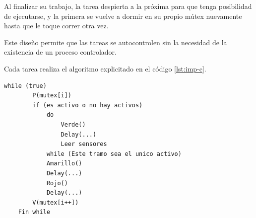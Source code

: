 Al finalizar su trabajo, la tarea despierta a la próxima para que tenga posibilidad de ejecutarse, y la primera se vuelve a dormir en su propio mútex nuevamente hasta que le toque correr otra vez.

Este diseño permite que las tareas se autocontrolen sin la necesidad de la existencia de un proceso controlador.

Cada tarea realiza el algoritmo explicitado en el código \ref{lst:imp-c}.

\begin{lstlisting}[label=lst:imp-c, caption=Pseudocódigo del programa que corre cada tarea en la implementación C.]
	while (true)
		P(mutex[i])
		if (es activo o no hay activos)
			do
				Verde()
				Delay(...)
				Leer sensores
			while (Este tramo sea el unico activo)
			Amarillo()
			Delay(...)
			Rojo()
			Delay(...)
		V(mutex[i++])
	Fin while
\end{lstlisting}
